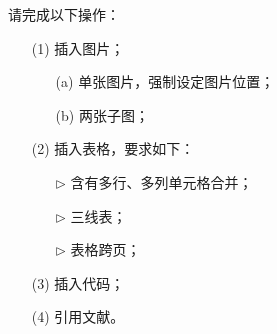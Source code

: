 \documentclass{assignment}
\begin{document}
\begin{pf}
\begin{itemize}
        \end{itemize}
    \end{pf}

    \clearpage
    \begin{prob}
        请完成以下操作：
        \begin{itemize}
            \item[(1)] 插入图片；
            \begin{itemize}
                \item[(a)] 单张图片，强制设定图片位置；
                \item[(b)] 两张子图；
            \end{itemize}
            \item[(2)] 插入表格，要求如下：
            \begin{itemize}
                \item[$\triangleright$] 含有多行、多列单元格合并；
                \item[$\triangleright$] 三线表；
                \item[$\triangleright$] 表格跨页；
            \end{itemize}
            \item[(3)] 插入代码；
            \item[(4)] 引用文献。
        \end{itemize}
    \end{prob}
\end{document}
